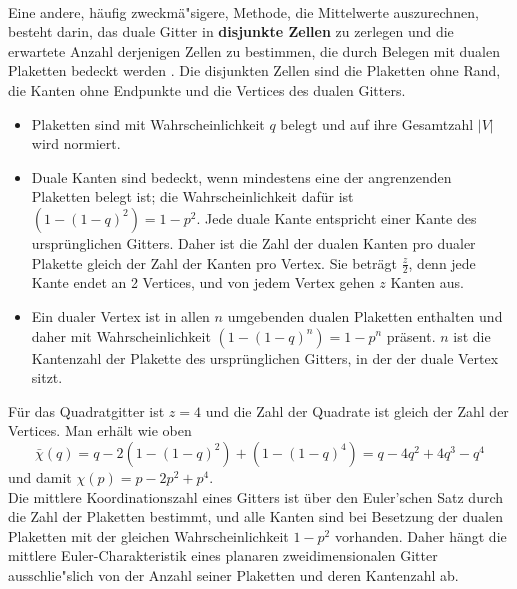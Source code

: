 \\Eine andere, h\"aufig zweckm\"a"sigere, Methode, die Mittelwerte auszurechnen, besteht darin, das duale Gitter in \textbf{disjunkte Zellen} zu zerlegen und die erwartete Anzahl derjenigen Zellen zu bestimmen, die durch Belegen mit dualen Plaketten bedeckt werden \cite{Likos:95}. Die disjunkten Zellen sind die Plaketten ohne Rand, die Kanten ohne Endpunkte und die Vertices des dualen Gitters. 
\begin{itemize}
\item Plaketten sind mit Wahrscheinlichkeit $q$ belegt und auf ihre Gesamtzahl $|V|$ wird normiert. 
\item Duale Kanten sind bedeckt, wenn mindestens eine der angrenzenden Plaketten belegt ist; die Wahrscheinlichkeit daf\"ur ist $(1-(1-q)^2)=1-p^2$. Jede duale Kante entspricht einer Kante des urspr\"unglichen Gitters. Daher ist die Zahl der dualen Kanten pro dualer Plakette gleich der Zahl der Kanten pro Vertex. Sie betr\"agt $\frac{z}{2}$, denn jede Kante endet an 2 Vertices, und von jedem Vertex gehen $z$ Kanten aus.
\item Ein dualer Vertex ist in allen $n$ umgebenden dualen Plaketten enthalten und daher mit Wahrscheinlichkeit $(1-(1-q)^n)=1-p^n$ pr\"asent. $n$ ist die Kantenzahl der Plakette des urspr\"unglichen Gitters, in der der duale Vertex sitzt.
\end{itemize}
F\"ur das Quadratgitter ist $z=4$ und die Zahl der Quadrate ist gleich der Zahl der Vertices. Man erh\"alt wie oben 
\begin{equation}
\bar{\chi}(q)=q-2(1-(1-q)^2)+(1-(1-q)^4)=q-4q^2+4q^3-q^4
\end{equation} 
und damit $\chi(p)=p-2p^2+p^4$.\\

Die mittlere Koordinationszahl eines Gitters ist \"uber den Euler'schen Satz durch die Zahl der Plaketten bestimmt, und alle Kanten sind bei Besetzung der dualen Plaketten mit der gleichen Wahrscheinlichkeit $1-p^2$ vorhanden. Daher h\"angt die mittlere Euler-Charakteristik eines planaren zweidimensionalen Gitter ausschlie"slich von der Anzahl seiner Plaketten und deren Kantenzahl ab.\\

